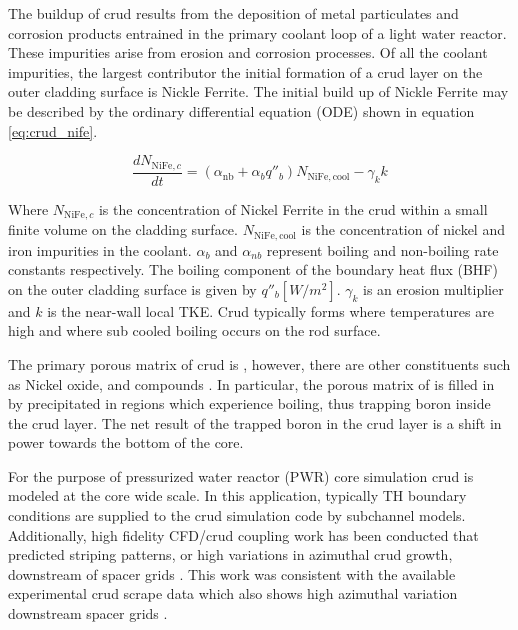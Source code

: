 The buildup of crud results from the deposition of metal particulates and corrosion products entrained in the primary coolant loop of a light water reactor.  These impurities arise from erosion and corrosion processes.  Of all the coolant impurities, the largest contributor the initial formation of a crud layer on the outer cladding surface is Nickle Ferrite.  The initial build up of Nickle Ferrite may be described by the ordinary differential equation (ODE) shown in equation \ref{eq:crud_nife}.

\begin{equation}
\frac{d N_{\mathrm{NiFe},c}}{dt} = (\alpha_{\mathrm{nb}} + \alpha_{b}q''_{b} )N_{\mathrm{NiFe}, \mathrm{cool}} - \gamma_k k
\label{eq:crud_nife}
\end{equation}

Where $N_{\mathrm{NiFe},c}$ is the concentration of Nickel Ferrite in the crud within a small finite volume on the cladding surface.  $N_{\mathrm{NiFe}, \mathrm{cool}}$ is the concentration of nickel and iron impurities in the coolant.  $\alpha_b$ and $\alpha_{nb}$ represent boiling and non-boiling rate constants respectively.  The boiling component of the boundary heat flux (BHF) on the outer cladding surface is given by $q''_b [W/m^2]$. $\gamma_k$ is an erosion multiplier and $k$ is the near-wall local TKE.  Crud typically forms where temperatures are high and where sub cooled boiling occurs on the rod surface.

The primary porous matrix of crud is , however, there are other constituents such as Nickel oxide,  and  compounds \cite{Henshaw2006TheCO} \cite{mongoose17}. In particular, the porous matrix of  is filled in by precipitated  in regions which experience boiling, thus trapping boron inside the crud layer.  The net result of the trapped boron in the crud layer is a shift in power towards the bottom of the core.

For the purpose of pressurized water reactor (PWR) core simulation crud is modeled at the core wide scale.  In this application, typically TH boundary conditions are supplied to the crud simulation code by subchannel models.  Additionally, high fidelity CFD/crud coupling work has been conducted that predicted striping patterns, or high variations in azimuthal crud growth, downstream of spacer grids \cite{slattery16}.  This work was consistent with the available experimental crud scrape data which also shows high azimuthal variation downstream spacer grids \cite{kendrick13}.

